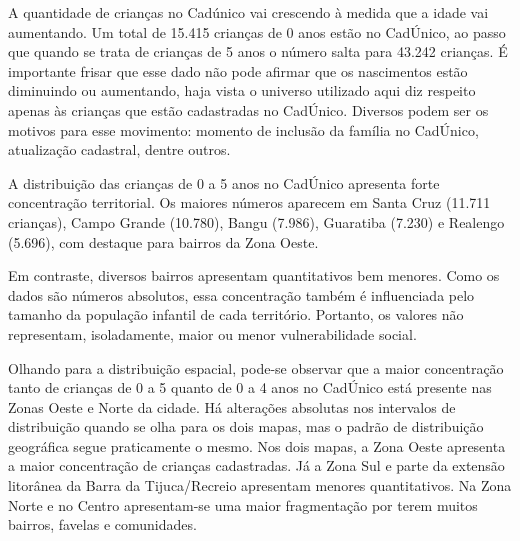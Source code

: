 
A quantidade de crianças no Cadúnico vai crescendo à medida que a idade vai aumentando. Um total de 15.415 crianças de 0 anos estão no CadÚnico, ao passo que quando se trata de crianças de 5 anos o número salta para 43.242 crianças. É importante frisar que esse dado não pode afirmar que os nascimentos estão diminuindo ou aumentando, haja vista o universo utilizado aqui diz respeito apenas às crianças que estão cadastradas no CadÚnico. Diversos podem ser os motivos para esse movimento: momento de inclusão da família no CadÚnico, atualização cadastral, dentre outros.


A distribuição das crianças de 0 a 5 anos no CadÚnico apresenta forte concentração territorial. Os maiores números aparecem em Santa Cruz (11.711 crianças), Campo Grande (10.780), Bangu (7.986), Guaratiba (7.230) e Realengo (5.696), com destaque para bairros da Zona Oeste.

Em contraste, diversos bairros apresentam quantitativos bem menores. Como os dados são números absolutos, essa concentração também é influenciada pelo tamanho da população infantil de cada território. Portanto, os valores não representam, isoladamente, maior ou menor vulnerabilidade social.


Olhando para a distribuição espacial, pode-se observar que a maior concentração tanto de crianças de 0 a 5 quanto de 0 a 4 anos no CadÚnico está presente nas Zonas Oeste e Norte da cidade. Há alterações absolutas nos intervalos de distribuição quando se olha para os dois mapas, mas o padrão de distribuição geográfica segue praticamente o mesmo. Nos dois mapas, a Zona Oeste apresenta a maior concentração de crianças cadastradas. Já a Zona Sul e parte da extensão litorânea da Barra da Tijuca/Recreio apresentam menores quantitativos. Na Zona Norte e no Centro apresentam-se uma maior fragmentação por terem muitos bairros, favelas e comunidades.

